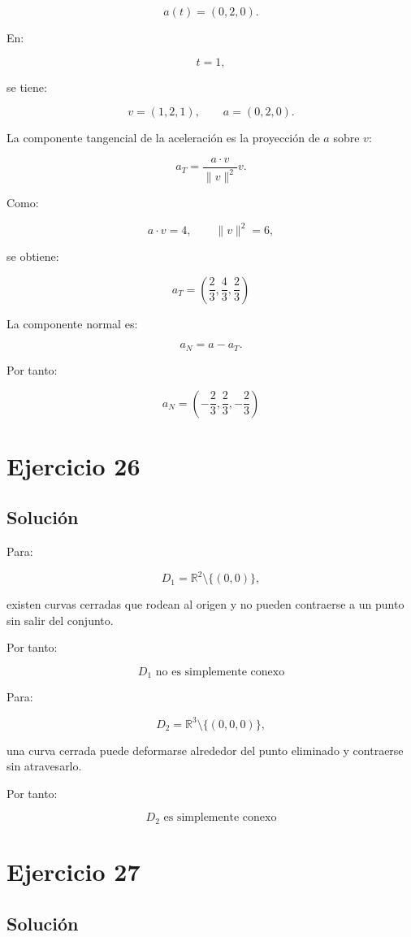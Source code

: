\documentclass[11pt,a4paper]{article}
\newcommand{\R}{\mathbb{R}}
\begin{document}
\[
a(t)
=
(0,2,0).
\]

En:

\[
t=1,
\]

se tiene:

\[
v=(1,2,1),
\qquad
a=(0,2,0).
\]

La componente tangencial de la aceleración es la proyección de \(a\) sobre \(v\):

\[
a_T
=
\frac{a\cdot v}{\|v\|^2}v.
\]

Como:

\[
a\cdot v=4,
\qquad
\|v\|^2=6,
\]

se obtiene:

\[
\boxed{
a_T
=
\left(
\frac23,\frac43,\frac23
\right)
}
\]

La componente normal es:

\[
a_N
=
a-a_T.
\]

Por tanto:

\[
\boxed{
a_N
=
\left(
-\frac23,\frac23,-\frac23
\right)
}
\]

\section{Ejercicio 26}
\subsection{Solución}

Para:

\[
D_1
=
\R^2\setminus\{(0,0)\},
\]

existen curvas cerradas que rodean al origen y no pueden contraerse a un punto sin salir del conjunto.

Por tanto:

\[
\boxed{
D_1\text{ no es simplemente conexo}
}
\]

Para:

\[
D_2
=
\R^3\setminus\{(0,0,0)\},
\]

una curva cerrada puede deformarse alrededor del punto eliminado y contraerse sin atravesarlo.

Por tanto:

\[
\boxed{
D_2\text{ es simplemente conexo}
}
\]

\section{Ejercicio 27}
\subsection{Solución}
\end{document}

